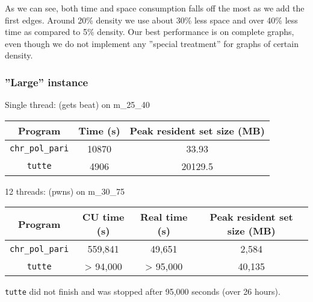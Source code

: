 \documentclass[a4paper]{article}
\newcommand{\code}{\texttt}
\begin{document}
As we can see, both time and space consumption falls off the most as we add the first edges. Around 20\% density we use about 30\% less space and over 40\% less time as compared to 5\% density. Our best performance is on complete graphs, even though we do not implement any ''special treatment'' for graphs of certain density.

\subsubsection{''Large'' instance}
Single thread: (gets beat) on m\_25\_40 
\begin{center}
 \begin{tabular}{|c|c|c|} \hline
  Program & Time (s) & Peak resident set size (MB) \\ \hline
  \code{chr\_pol\_pari} & 10870 & 33.93 \\ \hline
  \code{tutte} & 4906 & 20129.5 \\ \hline
 \end{tabular}

\end{center}

12 threads: (pwns) on m\_30\_75

\begin{center}
 \begin{tabular}{|c|c|c|c|} \hline
  Program & CU time (s) & Real time (s) & Peak resident set size (MB) \\ \hline
  \code{chr\_pol\_pari} & 559,841 & 49,651 & 2,584 \\ \hline
  \code{tutte} & > 94,000 & > 95,000 & 40,135 \\ \hline
 \end{tabular}

\end{center}

\code{tutte} did not finish and was stopped after 95,000 seconds (over 26 hours).


\end{document}
